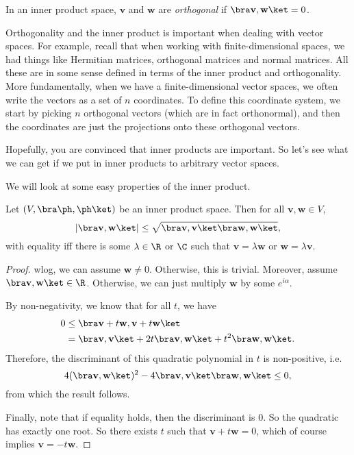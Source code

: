 \documentclass[a4paper]{article}
\begin{document}
\begin{defi}[Orthogonality]
  In an inner product space, $\mathbf{v}$ and $\mathbf{w}$ are \emph{orthogonal} if $\bra \mathbf{v}, \mathbf{w} \ket = 0$.
\end{defi}

Orthogonality and the inner product is important when dealing with vector spaces. For example, recall that when working with finite-dimensional spaces, we had things like Hermitian matrices, orthogonal matrices and normal matrices. All these are in some sense defined in terms of the inner product and orthogonality. More fundamentally, when we have a finite-dimensional vector spaces, we often write the vectors as a set of $n$ coordinates. To define this coordinate system, we start by picking $n$ orthogonal vectors (which are in fact orthonormal), and then the coordinates are just the projections onto these orthogonal vectors.

Hopefully, you are convinced that inner products are important. So let's see what we can get if we put in inner products to arbitrary vector spaces.

We will look at some easy properties of the inner product.
\begin{prop}
  Let $(V, \bra \ph,\ph\ket)$ be an inner product space. Then for all $\mathbf{v}, \mathbf{w} \in V$,
  \[
    |\bra \mathbf{v}, \mathbf{w}\ket| \leq \sqrt{\bra \mathbf{v}, \mathbf{v}\ket \bra \mathbf{w}, \mathbf{w}\ket},
  \]
  with equality iff there is some $\lambda \in \R$ or $\C$ such that $\mathbf{v} = \lambda \mathbf{w}$ or $\mathbf{w} = \lambda \mathbf{v}$.
\end{prop}

\begin{proof}
  wlog, we can assume $\mathbf{w} \not= 0$. Otherwise, this is trivial. Moreover, assume $\bra \mathbf{v}, \mathbf{w}\ket \in \R$. Otherwise, we can just multiply $\mathbf{w}$ by some $e^{i\alpha}$.

  By non-negativity, we know that for all $t$, we have
  \begin{align*}
    0 &\leq \bra \mathbf{v} + t\mathbf{w}, \mathbf{v} + t\mathbf{w}\ket\\
    &= \bra \mathbf{v}, \mathbf{v}\ket + 2t\bra \mathbf{v}, \mathbf{w}\ket + t^2 \bra \mathbf{w}, \mathbf{w}\ket.
  \end{align*}
  Therefore, the discriminant of this quadratic polynomial in $t$ is non-positive, i.e.
  \[
    4(\bra \mathbf{v}, \mathbf{w}\ket)^2 - 4\bra \mathbf{v}, \mathbf{v}\ket \bra \mathbf{w}, \mathbf{w}\ket \leq 0,
  \]
  from which the result follows.

  Finally, note that if equality holds, then the discriminant is $0$. So the quadratic has exactly one root. So there exists $t$ such that $\mathbf{v} + t\mathbf{w} = 0$, which of course implies $\mathbf{v} = -t\mathbf{w}$.
\end{proof}
\end{document}
